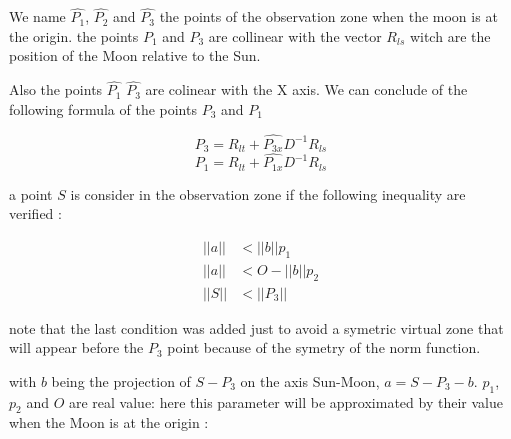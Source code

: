 \documentclass{article} %
\begin{document}
		
		
		We name $\hat{P_1}$, $\hat{P_2}$ and $\hat{P_3}$ the points of the observation zone when the moon is at the origin. the points $P_1$ and $P_3$ are collinear with the vector $R_{ls}$ witch are the position of the Moon relative to the Sun.
		
		Also the points $\hat{P_1}$ $\hat{P_3}$ are colinear with the X axis. We can conclude of the following formula of the points $P_3$ and $P_1$
		
		
		$$
		\begin{equation}
			P_3=R_{lt}+\hat{P_{3x}}D^{-1}R_{ls} 
		\end{equation}
		$$
		$$
		\begin{equation}
			P_1=R_{lt}+\hat{P_{1x}}D^{-1}R_{ls} 
		\end{equation}
		$$
		
		a point $S$ is consider in the observation zone if the following inequality are verified : 
		
		$$
		\begin{equation}
			\begin{align}
				||a||&<||b||p_1\\
				||a||&<O-||b||p_2\\
				||S||&<||P_3||
			\end{align}	
		\end{equation}
		$$
		
		note that the last condition was added just to avoid a symetric virtual zone that will appear before the $P_3$ point because of the symetry of the norm function.
		
		with $b$ being the projection of $S-P_3$ on the axis Sun-Moon, $a=S-P_3-b$. $p_1$, $p_2$ and $O$ are real value: here this parameter will be approximated by their value when the Moon is at the origin :
		
		
\end{document}
